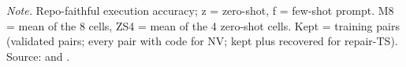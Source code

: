 \vspace{-0.6\baselineskip}
{\footnotesize\color{slate}\textit{Note.} Repo-faithful execution accuracy; z = zero-shot, f = few-shot prompt. M8 = mean of the 8 cells, ZS4 = mean of the 4 zero-shot cells. Kept = training pairs (validated pairs; every pair with code for NV; kept plus recovered for repair-TS). Source:  and .\par}
\medskip
